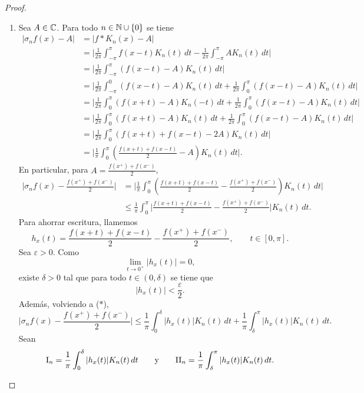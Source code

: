 \documentclass[a4paper, 11pt, oneside]{report}
\begin{document}
\begin{proof}
\hfil
  \begin{enumerate}
    \item Sea $A \in \mathbb C$. Para todo $n \in \mathbb N \cup \{0\}$ se tiene
    \begin{align*}
      |\sigma_nf(x)-A| &= |f \ast K_n(x) - A| \\
      &= \biggl|\frac{1}{2\pi} \int_{-\pi}^\pi f(x-t)K_n(t) \, dt - \frac{1}{2\pi}\int_{-\pi}^\pi A K_n(t) \, dt\biggr| \\
      &= \biggl|\frac{1}{2\pi} \int_{-\pi}^\pi (f(x-t)-A)K_n(t) \, dt \biggr| \\
      &=  \biggl|\frac{1}{2\pi} \int_{-\pi}^0 (f(x-t)-A)K_n(t) \, dt+ \frac{1}{2\pi} \int_{0}^\pi (f(x-t)-A)K_n(t) \, dt \biggr| \\
      &= \biggl|\frac{1}{2\pi} \int_{0}^\pi (f(x+t)-A)K_n(-t) \, dt+ \frac{1}{2\pi} \int_{0}^\pi (f(x-t)-A)K_n(t) \, dt \biggr| \\
      &= \biggl|\frac{1}{2\pi} \int_{0}^\pi (f(x+t)-A)K_n(t) \, dt+ \frac{1}{2\pi} \int_{0}^\pi (f(x-t)-A)K_n(t) \, dt \biggr| \\
      &= \biggl|\frac{1}{2\pi}\int_0^\pi(f(x+t)+f(x-t)-2A) K_n(t) \, dt\biggr| \\
      &= \biggl|\frac{1}{\pi}\int_0^\pi\left(\frac{f(x+t)+f(x-t)}{2}-A\right) K_n(t) \, dt\biggr|.
    \end{align*}
    En particular, para $A = \frac{f(x^+)+f(x^-)}{2}$,
    \begin{align*}
      \biggl|\sigma_nf(x) - \frac{f(x^+)+f(x^-)}{2}\biggr| &= \biggl|\frac{1}{\pi}\int_0^\pi\left(\frac{f(x+t)+f(x-t)}{2}-\frac{f(x^+)+f(x^-)}{2}\right) K_n(t) \, dt\biggr| \\
      &\leq \frac{1}{\pi}\int_0^\pi\biggl|\frac{f(x+t)+f(x-t)}{2}-\frac{f(x^+)+f(x^-)}{2}\biggr| K_n(t) \, dt. \tag{$\ast$}
    \end{align*}
    Para ahorrar escritura, llamemos
    \[h_x(t) = \frac{f(x+t)+f(x-t)}{2}-\frac{f(x^+)+f(x^-)}{2}, \qquad t \in [0,\pi].\]
    Sea $\varepsilon > 0$. Como
    \[\lim_{t \to 0^+} |h_x(t)|= 0,\]
    existe $\delta > 0$ tal que para todo $t \in (0,\delta)$ se tiene que
    \[|h_x(t)| < \frac{\varepsilon}{2}. \tag{$\ast\ast$}\]
    Además, volviendo a ($\ast$),
    \[\biggl|\sigma_nf(x) - \frac{f(x^+)+f(x^-)}{2}\biggr| \leq \frac{1}{\pi}\int_0^\delta |h_x(t)| K_n(t) \, dt +\frac{1}{\pi}\int_\delta^\pi |h_x(t)| K_n(t) \, dt. \tag{$\ast\ast\ast$}\]
    Sean
    \[\textup{I}_n = \frac{1}{\pi}\int_0^\delta |h_x(t)|K_n(t) \, dt \qquad \textup{y} \qquad \textup{II}_n = \frac{1}{\pi}\int_\delta^\pi |h_x(t)|K_n(t) \, dt.\]

\end{enumerate}
\end{proof}
\end{document}
